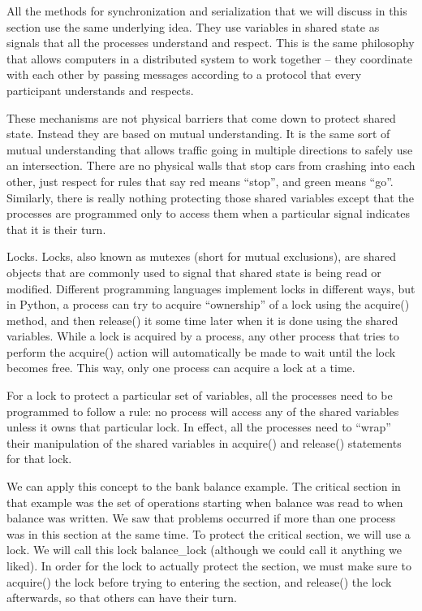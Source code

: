 \documentclass[letterpaper,10pt,dvipdfmx]{sphinxmanual}
\begin{document}
All the methods for synchronization and serialization that we will discuss in this section use the same underlying idea. They use variables in shared state as signals that all the processes understand and respect. This is the same philosophy that allows computers in a distributed system to work together -- they coordinate with each other by passing messages according to a protocol that every participant understands and respects.

These mechanisms are not physical barriers that come down to protect shared state. Instead they are based on mutual understanding. It is the same sort of mutual understanding that allows traffic going in multiple directions to safely use an intersection. There are no physical walls that stop cars from crashing into each other, just respect for rules that say red means ``stop'', and green means ``go''. Similarly, there is really nothing protecting those shared variables except that the processes are programmed only to access them when a particular signal indicates that it is their turn.

Locks. Locks, also known as mutexes (short for mutual exclusions), are shared objects that are commonly used to signal that shared state is being read or modified. Different programming languages implement locks in different ways, but in Python, a process can try to acquire ``ownership'' of a lock using the acquire() method, and then release() it some time later when it is done using the shared variables. While a lock is acquired by a process, any other process that tries to perform the acquire() action will automatically be made to wait until the lock becomes free. This way, only one process can acquire a lock at a time.

For a lock to protect a particular set of variables, all the processes need to be programmed to follow a rule: no process will access any of the shared variables unless it owns that particular lock. In effect, all the processes need to ``wrap'' their manipulation of the shared variables in acquire() and release() statements for that lock.

We can apply this concept to the bank balance example. The critical section in that example was the set of operations starting when balance was read to when balance was written. We saw that problems occurred if more than one process was in this section at the same time. To protect the critical section, we will use a lock. We will call this lock balance\_lock (although we could call it anything we liked). In order for the lock to actually protect the section, we must make sure to acquire() the lock before trying to entering the section, and release() the lock afterwards, so that others can have their turn.
\end{document}
